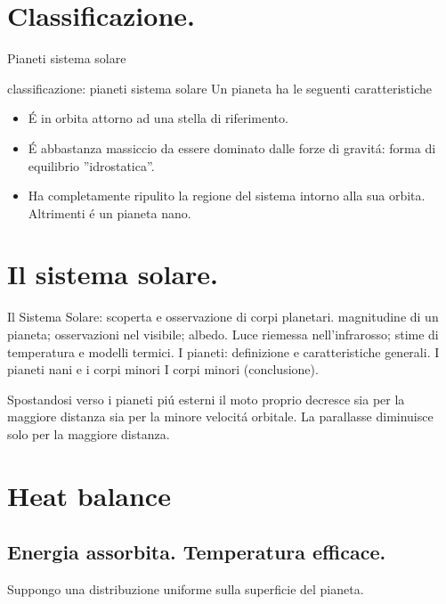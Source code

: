 
\section{Classificazione.}

\begin{frame}{Pianeti sistema solare}
\end{frame}

\begin{wordonframe}{classificazione: pianeti sistema solare}
Un pianeta ha le seguenti caratteristiche
\begin{itemize}
    \item \'E in orbita attorno ad una stella di riferimento.
    \item \'E abbastanza massiccio da essere dominato dalle forze di gravit\'a: forma di equilibrio ''idrostatica''.
    \item Ha completamente ripulito la regione del sistema intorno alla sua orbita. Altrimenti \'e un pianeta nano.
\end{itemize}

\end{wordonframe}

\section{Il sistema solare.}

Il Sistema Solare: scoperta e osservazione di corpi planetari. magnitudine di un pianeta; osservazioni nel visibile; albedo. Luce riemessa nell'infrarosso; stime di temperatura e modelli termici.
I pianeti: definizione e caratteristiche generali.
I pianeti nani e i corpi minori 
I corpi minori (conclusione). 

Spostandosi verso i pianeti pi\'u esterni il moto proprio decresce sia per la maggiore distanza sia per la minore velocit\'a orbitale. La parallasse diminuisce solo per la maggiore distanza.

\section{Heat balance}

\subsection{Energia assorbita. Temperatura efficace.}

Suppongo una distribuzione uniforme sulla superficie del pianeta.

